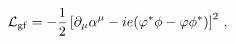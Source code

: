 \begin{equation}
{\cal L}_{\rm gf}=-\frac 12 \left[ \partial_\mu \alpha^\mu 
-ie (\varphi^* \phi - \varphi \phi^*) \right]^2\,,\label{gfterm}
\end{equation}

